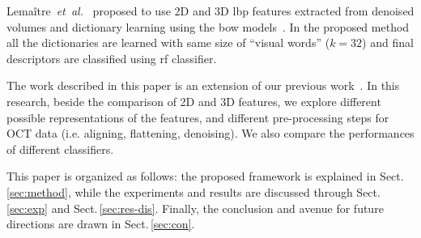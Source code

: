 Lema\^{i}tre~\emph{et~al.}~\cite{Lemaintre2015miccaiOCT} proposed to use 2D and 3D \ac{lbp} features extracted from denoised volumes and dictionary learning using the \ac{bow} models~\cite{Sivic2003}.
In the proposed method all the dictionaries are learned with same size of ``visual words'' ($k = 32$) and final descriptors are classified using \ac{rf} classifier.

The work described in this paper is an extension of our previous work~\cite{Lemaintre2015miccaiOCT}.
In this research, beside the comparison of 2D and 3D features, we explore different possible representations of the features, and different pre-processing steps for OCT data (i.e. aligning, flattening, denoising). 
We also compare the performances of different classifiers. 
 
 
This paper is organized as follows: the proposed framework is explained in Sect.\,\ref{sec:method}, while the experiments and results are discussed through Sect.\,\ref{sec:exp} and Sect.\,\ref{sec:res-dis}.
Finally, the conclusion and avenue for future directions are drawn in Sect.\,\ref{sec:con}.


